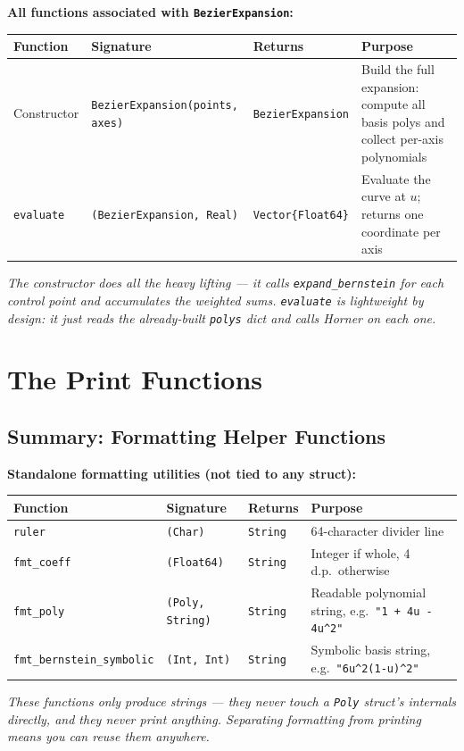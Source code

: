 \documentclass[12pt, a4paper]{article}
\newcommand{\cd}[1]{\texttt{#1}}
\begin{document}
\begin{notebox}
\textbf{All functions associated with \texttt{BezierExpansion}:}

\medskip
\begin{tabular}{lp{4.5cm}p{2.8cm}p{3.5cm}}
\toprule
Function & Signature & Returns & Purpose \\
\midrule
Constructor &
  \cd{BezierExpansion(points, axes)} &
  \cd{BezierExpansion} &
  Build the full expansion: compute all basis polys and collect per-axis polynomials \\[4pt]
\cd{evaluate} &
  \cd{(BezierExpansion, Real)} &
  \cd{Vector\{Float64\}} &
  Evaluate the curve at $u$; returns one coordinate per axis \\
\bottomrule
\end{tabular}

\medskip
\textit{The constructor does all the heavy lifting --- it calls
\cd{expand\_bernstein} for each control point and accumulates the
weighted sums.
\cd{evaluate} is lightweight by design: it just reads the already-built
\cd{polys} dict and calls Horner on each one.}
\end{notebox}


\section{The Print Functions}

\subsection*{Summary: Formatting Helper Functions}

\begin{notebox}
\textbf{Standalone formatting utilities (not tied to any struct):}

\medskip
\begin{tabular}{lp{4cm}p{2cm}p{4cm}}
\toprule
Function & Signature & Returns & Purpose \\
\midrule
\cd{ruler} &
  \cd{(Char)} &
  \cd{String} &
  64-character divider line \\[4pt]
\cd{fmt\_coeff} &
  \cd{(Float64)} &
  \cd{String} &
  Integer if whole, 4 d.p.\ otherwise \\[4pt]
\cd{fmt\_poly} &
  \cd{(Poly, String)} &
  \cd{String} &
  Readable polynomial string, e.g.\ \cd{"1 + 4u - 4u\^{}2"} \\[4pt]
\cd{fmt\_bernstein\_symbolic} &
  \cd{(Int, Int)} &
  \cd{String} &
  Symbolic basis string, e.g.\ \cd{"6u\^{}2(1-u)\^{}2"} \\
\bottomrule
\end{tabular}

\medskip
\textit{These functions only produce strings --- they never touch a
\cd{Poly} struct's internals directly, and they never print anything.
Separating formatting from printing means you can reuse them anywhere.}
\end{notebox}
\end{document}
